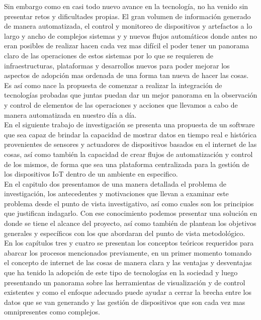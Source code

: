 Sin embargo como en casi todo nuevo avance en la tecnología, no ha venido sin presentar retos y dificultades propias. El gran volumen de información generado de manera automatizada, el control y monitoreo de dispositivos y artefactos a lo largo y ancho de complejos sistemas y y nuevos flujos automáticos donde antes no eran posibles de realizar hacen cada vez mas difícil el poder tener un panorama claro de las operaciones de estos sistemas por lo que se requieren de infraestructuras, plataformas y desarrollos nuevos para poder mejorar los aspectos de adopción mas ordenada de una forma tan nueva de hacer las cosas. Es así como nace la propuesta de comenzar a realizar la integración de tecnologías probadas que juntas puedan dar un mejor panorama en la observación y control de elementos de las operaciones y acciones que llevamos a cabo de manera automatizada en nuestro día a día.\\

En el siguiente trabajo de investigación se presenta una propuesta de un software que sea capaz de brindar la capacidad de mostrar datos en tiempo real e histórica provenientes de sensores y actuadores de dispositivos basados en el internet de las cosas, así como también la capacidad de crear flujos de automatización y control de los mismos, de forma que sea una plataforma centralizada para la gestión de los dispositivos IoT dentro de un ambiente en especifico.\\

En el capitulo dos presentamos de una manera detallada el problema de investigación, los antecedentes y motivaciones que llevan a examinar este problema desde el punto de vista investigativo, así como cuales son los principios que justifican indagarlo. Con ese conocimiento podemos presentar una solución en donde se tiene el alcance del proyecto, así como también de plantean los objetivos generales y específicos con los que abordaran del punto de vista metodológico.\\

En los capítulos tres y cuatro se presentan los conceptos teóricos requeridos para abarcar los procesos mencionados previamente, en un primer momento tomando el concepto de internet de las cosas de manera clara y las ventajas y desventajas que ha tenido la adopción de este tipo de tecnologías en la sociedad y luego presentando un panorama sobre las herramientas de visualización y de control existentes y como el enfoque adecuado puede ayudar a cerrar la brecha entre los datos que se van generando y las gestión de dispositivos que son cada vez mas omnipresentes como complejos.\\

